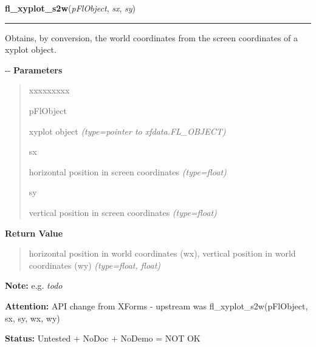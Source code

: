     \label{xformslib:flxyplot:fl_xyplot_s2w}

    \vspace{0.5ex}

\hspace{.8\funcindent}\begin{boxedminipage}{\funcwidth}

    \raggedright \textbf{fl\_xyplot\_s2w}(\textit{pFlObject}, \textit{sx}, \textit{sy})

    \vspace{-1.5ex}

    \rule{\textwidth}{0.5\fboxrule}
\setlength{\parskip}{2ex}

Obtains, by conversion, the world coordinates from the screen
coordinates of a xyplot object.

-{}-
\setlength{\parskip}{1ex}
      \textbf{Parameters}
      \vspace{-1ex}

      \begin{quote}
        \begin{Ventry}{xxxxxxxxx}

          \item[pFlObject]


xyplot object
            {\it (type=pointer to xfdata.FL\_OBJECT)}

          \item[sx]


horizontal position in screen coordinates
            {\it (type=float)}

          \item[sy]


vertical position in screen coordinates
            {\it (type=float)}

        \end{Ventry}

      \end{quote}

      \textbf{Return Value}
    \vspace{-1ex}

      \begin{quote}

horizontal position in world coordinates (wx), vertical position
in world coordinates (wy)
      {\it (type=float, float)}

      \end{quote}

\textbf{Note:} 
e.g. \emph{todo}


\textbf{Attention:} 
API change from XForms - upstream was
fl\_xyplot\_s2w(pFlObject, sx, sy, wx, wy)


\textbf{Status:} 
Untested + NoDoc + NoDemo = NOT OK


    \end{boxedminipage}

